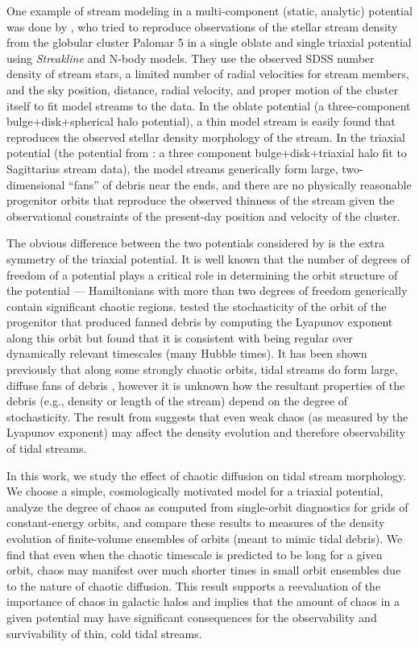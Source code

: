 \documentclass[letterpaper,12pt,preprint]{aastex}
\begin{document}
One example of stream modeling in a multi-component (static, analytic) potential was done by \citet{pearson15}, who tried to reproduce observations of the stellar stream density from the globular cluster Palomar 5 in a single oblate and single triaxial potential using \emph{Streakline} \citep{kuepper12} and N-body models. They use the observed SDSS number density of stream stars, a limited number of radial velocities for stream members, and the sky position, distance, radial velocity, and proper motion of the cluster itself to fit model streams to the data. In the oblate potential (a three-component bulge+disk+spherical halo potential), a thin model stream is easily found that reproduces the observed stellar density morphology of the stream. In the triaxial potential (the potential from \cite{law10}: a three component bulge+disk+triaxial halo fit to Sagittarius stream data), the model streams generically form large, two-dimensional ``fans'' of debris near the ends, and there are no physically reasonable progenitor orbits that reproduce the observed thinness of the stream given the observational constraints of the present-day position and velocity of the cluster. 

The obvious difference between the two potentials considered by \citet{pearson15} is the extra symmetry of the triaxial potential. It is well known that the number of degrees of freedom of a potential plays a critical role in determining the orbit structure of the potential --- Hamiltonians with more than two degrees of freedom generically contain significant chaotic regions. \citet{pearson15} tested the stochasticity of the orbit of the progenitor that produced fanned debris by computing the Lyapunov exponent along this orbit but found that it is consistent with being regular over dynamically relevant timescales (many Hubble times). It has been shown previously that along some strongly chaotic orbits, tidal streams do form large, diffuse fans of debris \citep[e.g.,][]{fardal14}, however it is unknown how the resultant properties of the debris (e.g., density or length of the stream) depend on the degree of stochasticity. The result from \citet{pearson15} suggests that even weak chaos (as measured by the Lyapunov exponent) may affect the density evolution and therefore observability of tidal streams. 

In this work, we study the effect of chaotic diffusion on tidal stream morphology. We choose a simple, cosmologically motivated model for a triaxial potential, analyze the degree of chaos as computed from single-orbit diagnostics for grids of constant-energy orbits, and compare these results to measures of the density evolution of finite-volume ensembles of orbits (meant to mimic tidal debris). We find that even when the chaotic timescale is predicted to be long for a given orbit, chaos may manifest over much shorter times in small orbit ensembles due to the nature of chaotic diffusion. This result supports a reevaluation of the importance of chaos in galactic halos and implies that the amount of chaos in a given potential may have significant consequences for the observability and survivability of thin, cold tidal streams. 
\end{document}
